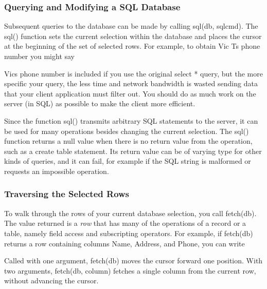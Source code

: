 \subsubsection{Querying and Modifying a SQL Database}
Subsequent queries to the database can be made by calling
\textsf{sql(db, sqlcmd)}. The \textsf{sql()} function sets
the current selection within the database and places the cursor at the
beginning of the set of selected rows. For example, to obtain Vic
T{\textquotesingle}s phone number you might say


Vic{\textquotesingle}s phone number is included if you use the original
\textsf{select *} query, but the more specific your query, the less
time and network bandwidth is wasted sending data that your client
application must filter out. You should do as much work on the server
(in SQL) as possible to make the client more efficient.

Since the function \textsf{sql()} transmits arbitrary SQL statements to
the server, it can be used for many operations besides changing the
current selection. The \textsf{sql()} function returns a null value
when there is no return value from the operation, such as a
\textsf{create table} statement. Its return value can be of varying
type for other kinds of queries, and it can fail, for example if the
SQL string is malformed or requests an impossible operation.

\subsubsection{Traversing the Selected Rows}
To walk through the rows of your current database selection, you call
\textsf{fetch(db)}. The value returned is a
\textit{row} that has many of the operations of a record or a table,
namely field access and subscripting operators. For example, if
\textsf{fetch(db)} returns a row containing columns Name, Address, and
Phone, you can write


Called with one argument, \textsf{fetch(db)} moves the cursor forward
one position. With two arguments, \textsf{fetch(db, column)} fetches a
single column from the current row, without advancing the cursor.

